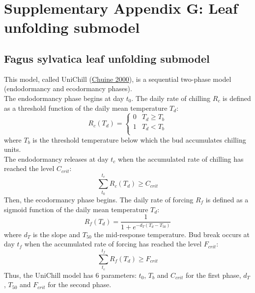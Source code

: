 \documentclass[11pt,]{article}
\begin{document}
\newpage

\hypertarget{appendixG}{%
\section{Supplementary Appendix G: Leaf unfolding
submodel}\label{appendixG}}

\renewcommand*\thetable{G.\arabic{table}}
\renewcommand*\thefigure{G.\arabic{figure}}

\setcounter{figure}{0}
\setcounter{table}{0}

\renewcommand*{\thepage}{G--\arabic{page}}

\hfill \break

\hypertarget{fagus-sylvatica-leaf-unfolding-submodel}{%
\subsection{Fagus sylvatica leaf unfolding
submodel}\label{fagus-sylvatica-leaf-unfolding-submodel}}

This model, called UniChill (\protect\hyperlink{ref-Chuine2000}{Chuine
2000}), is a sequential two-phase model (endodormancy and ecodormancy
phases).\\
The endodormancy phase begins at day \(t_0\). The daily rate of chilling
\(R_c\) is defined as a threshold function of the daily mean temperature
\(T_d\): \[ R_c(T_d) = \left\{
\begin{array}{ll}
      0 & T_d \geq T_b \\
      1 & T_d < T_b \\
\end{array} 
\right. \] where \(T_b\) is the threshold temperature below which the
bud accumulates chilling units.\\
The endodormancy releases at day \(t_c\) when the accumulated rate of
chilling has reached the level \(C_{crit}\):
\[\sum\limits_{t_0}^{t_c} R_c(T_d) \geq C_{crit} \] Then, the
ecodormancy phase begins. The daily rate of forcing \(R_f\) is defined
as a sigmoid function of the daily mean temperature \(T_d\):
\[R_f(T_d) = \frac{1}{1 + e^{-d_T(T_d-T_{50})}} \] where \(d_T\) is the
slope and \(T_{50}\) the mid-response temperature. Bud break occurs at
day \(t_f\) when the accumulated rate of forcing has reached the level
\(F_{crit}\): \[\sum\limits_{t_c}^{t_f} R_f(T_d) \geq F_{crit} \] Thus,
the UniChill model has 6 parameters: \(t_0\), \(T_b\) and \(C_{crit}\)
for the first phase, \(d_T\), \(T_{50}\) and \(F_{crit}\) for the second
phase.
\end{document}
